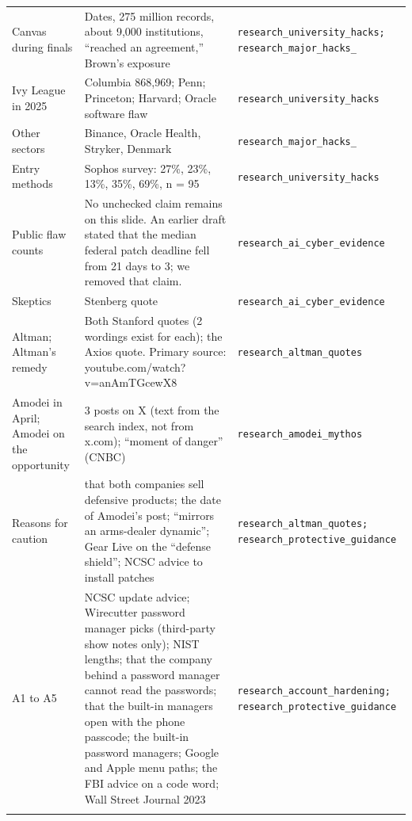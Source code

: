 \documentclass[10pt]{article}
\begin{document}
\begin{longtable}{L{0.22\textwidth}L{0.45\textwidth}L{0.25\textwidth}}
Canvas during finals & Dates, 275 million records, about 9,000 institutions, ``reached an agreement,'' Brown's exposure & \texttt{research\_\allowbreak university\_\allowbreak hacks; research\_\allowbreak major\_\allowbreak hacks\_}\\\addlinespace
Ivy League in 2025 & Columbia 868,969; Penn; Princeton; Harvard; Oracle software flaw & \texttt{research\_\allowbreak university\_\allowbreak hacks}\\\addlinespace
Other sectors & Binance, Oracle Health, Stryker, Denmark & \texttt{research\_\allowbreak major\_\allowbreak hacks\_}\\\addlinespace
Entry methods & Sophos survey: 27\%, 23\%, 13\%, 35\%, 69\%, n = 95 & \texttt{research\_\allowbreak university\_\allowbreak hacks}\\\addlinespace
Public flaw counts & No unchecked claim remains on this slide. An earlier draft stated that the median federal patch deadline fell from 21 days to 3; we removed that claim. & \texttt{research\_\allowbreak ai\_\allowbreak cyber\_\allowbreak evidence}\\\addlinespace
Skeptics & Stenberg quote & \texttt{research\_\allowbreak ai\_\allowbreak cyber\_\allowbreak evidence}\\\addlinespace
Altman; Altman's remedy & Both Stanford quotes (2 wordings exist for each); the Axios quote. Primary source: youtube.com/watch?v=anAmTGcewX8 & \texttt{research\_\allowbreak altman\_\allowbreak quotes}\\\addlinespace
Amodei in April; Amodei on the opportunity & 3 posts on X (text from the search index, not from x.com); ``moment of danger'' (CNBC) & \texttt{research\_\allowbreak amodei\_\allowbreak mythos}\\\addlinespace
Reasons for caution & that both companies sell defensive products; the date of Amodei's post; ``mirrors an arms-dealer dynamic''; Gear Live on the ``defense shield''; NCSC advice to install patches & \texttt{research\_\allowbreak altman\_\allowbreak quotes; research\_\allowbreak protective\_\allowbreak guidance}\\\addlinespace
A1 to A5 & NCSC update advice; Wirecutter password manager picks (third-party show notes only); NIST lengths; that the company behind a password manager cannot read the passwords; that the built-in managers open with the phone passcode; the built-in password managers; Google and Apple menu paths; the FBI advice on a code word; Wall Street Journal 2023 & \texttt{research\_\allowbreak account\_\allowbreak hardening; research\_\allowbreak protective\_\allowbreak guidance}\\\addlinespace

\end{longtable}
\end{document}
